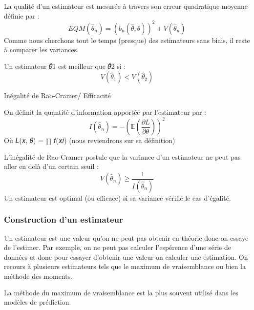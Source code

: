 \documentclass[
  letterpaper,
  DIV=11,
  numbers=noendperiod]{scrartcl}
\begin{document}
La qualité d'un estimateur est mesurée à travers son erreur quadratique
moyenne définie par :
\[EQM(\hat{\theta}_n) = (b_n(\hat{\theta}, \theta))^2 + V(\hat{\theta}_n)\]
Comme nous cherchons tout le temps (presque) des estimateurs sans biais,
il reste à comparer les variances.

Un estimateur 𝜃̂1 est meilleur que 𝜃̂2 si :
\[V(\hat{\theta}_1) < V(\hat{\theta}_2)\]

\textcolor{green!70!black}{Inégalité de Rao-Cramer/ Efficacité}

On définit la quantité d'information apportée par l'estimateur par : \[
I(\hat{\theta}_n) = -\left( \mathbb{E} \left( \frac{\partial L}{\partial \theta} \right) \right)^2
\] Où 𝐿(𝑥, 𝜃) = ∏ 𝑓(𝑥𝑖) (nous reviendrons sur sa définition)

L'inégalité de Rao-Cramer postule que la variance d'un estimateur ne
peut pas aller en delà d'un certain seuil :
\[V(\hat{\theta}_n) \geqslant \frac{1}{I(\hat{\theta}_n)}\] Un
estimateur est optimal (ou efficace) si sa variance vérifie le cas
d'égalité.

\newpage

\subsubsection{Construction d'un
estimateur}\label{construction-dun-estimateur}

Un estimateur est une valeur qu'on ne peut pas obtenir en théorie donc
on essaye de l'estimer. Par exemple, on ne peut pas calculer l'espérence
d'une série de données et donc pour essayer d'obtenir une valeur on
calculer une estimation. On recours à plusieurs estimateurs tels que le
maximum de vraisemblance ou bien la méthode des moments.

\begin{tcolorbox}[enhanced jigsaw, rightrule=.15mm, bottomrule=.15mm, opacitybacktitle=0.6, leftrule=.75mm, colbacktitle=quarto-callout-note-color!10!white, colback=white, opacityback=0, toprule=.15mm, left=2mm, title=\textcolor{quarto-callout-note-color}{\faInfo}\hspace{0.5em}{Note}, breakable, bottomtitle=1mm, colframe=quarto-callout-note-color-frame, toptitle=1mm, titlerule=0mm, coltitle=black, arc=.35mm]

La méthode du maximum de vraisemblance est la plus souvent utilisé dans
les modèles de prédiction.

\end{tcolorbox}
\end{document}
